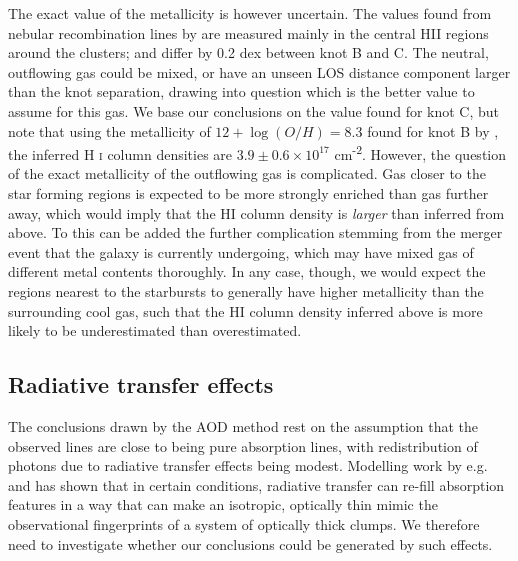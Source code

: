 \documentclass[twocolumn]{aastex61}
\begin{document}
The exact value of the metallicity is however uncertain. The values
found from nebular recombination lines by \citet{Guseva2012} are
measured mainly in the central HII regions around the clusters; and
differ by 0.2 dex between knot B and C. The neutral, outflowing gas
could be mixed, or have an unseen LOS distance component larger than the
knot separation, drawing into question which is the better value to
assume for this gas. We base our conclusions on the value found for knot
C, but note that using the metallicity of $12 + \log (O/H) = 8.3$ found
for knot B by \citet{Guseva2012}, the inferred H \textsc{i} column
densities are $3.9 \pm 0.6 \times 10^{17}$ cm\textsuperscript{-2}.
However, the question of the exact metallicity of the outflowing gas is
complicated. Gas closer to the star forming regions is expected to be
more strongly enriched than gas further away, which would imply that the
HI column density is \emph{larger} than inferred from  above.
To this can be added the further complication stemming from the merger
event that the galaxy is currently undergoing, which may have mixed gas
of different metal contents thoroughly. In any case, though, we would
expect the regions nearest to the starbursts to generally have higher
metallicity than the surrounding cool gas, such that the HI column
density inferred above is more likely to be underestimated than
overestimated.

\subsection{Radiative transfer effects}\label{sec:rt}

The conclusions drawn by the AOD method rest on the assumption that the
observed lines are close to being pure absorption lines, with
redistribution of photons due to radiative transfer effects being
modest. Modelling work by e.g. \citet{Prochaska2011} and
\citet{Scarlata2015} has shown that in certain conditions, radiative
transfer can re-fill absorption features in a way that can make an
isotropic, optically thin mimic the observational fingerprints of a
system of optically thick clumps. We therefore need to investigate
whether our conclusions could be generated by such effects.
\end{document}
